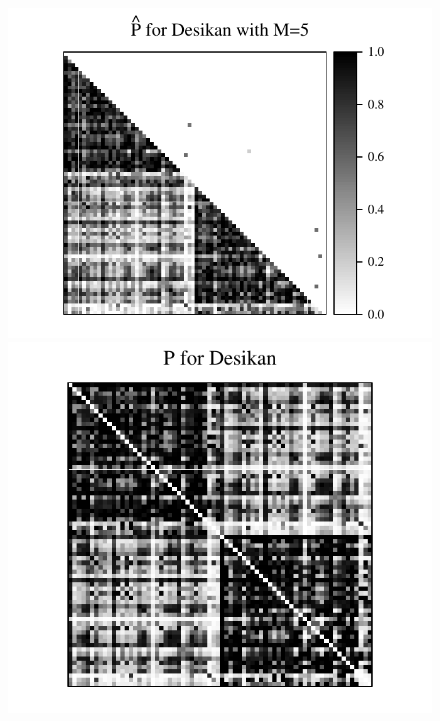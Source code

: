 \documentclass[10pt,letterpaper]{article}
\begin{document}
\begin{figure}[!tbp]
\includegraphics[height=.205\textheight]{Phat_desikan_m5.pdf}
\includegraphics[height=.2\textheight]{P_desikan.pdf} \hspace{-35pt}

\end{figure}
\end{document}
